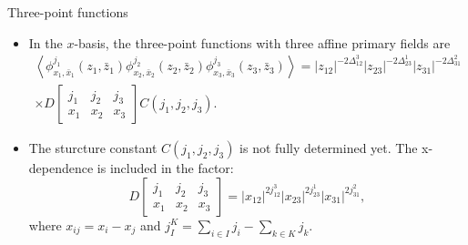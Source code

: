 \documentclass{beamer}
\newcommand{\vev}[1]{\left\langle #1 \right\rangle}
\begin{document}
\begin{frame}{Three-point functions}
  \begin{itemize}
    \item In the $x$-basis, the three-point functions with three affine primary fields are 
      {\tiny
        \begin{equation}
            \begin{aligned}
                    \vev{\phi^{j_{1}}_{x_{1},\bar{x}_{1}}(z_{1},\bar{z}_{1}) \phi^{j_{2}}_{x_{2},\bar{x}_{2}}(z_{2},\bar{z}_{2}) \phi^{j_{3}}_{x_{3},\bar{x}_{3}}(z_{3},\bar{z}_{3})} = 
                    |z_{12}|^{-2 \Delta_{12}^{3}} |z_{23}|^{-2 \Delta_{23}^{1}} |z_{31}|^{-2 \Delta_{31}^{2}} \\
                     \times D \left[\begin{array}{ccc}
            j_{1} & j_{2} & j_{3} \\
            x_{1} & x_{2} & x_{3}
            \end{array} \right] C(j_{1},j_{2},j_{3}).
            \end{aligned} \label{3pointfuncx}
        \end{equation}
      }
    \item The sturcture constant $C(j_{1},j_{2},j_{3})$ is not fully determined yet. The x-dependence is included in the factor:
        \begin{equation}
            D \left[\begin{array}{ccc}
            j_{1} & j_{2} & j_{3} \\
            x_{1} & x_{2} & x_{3}
            \end{array} \right] = |x_{12}|^{2 j_{12}^{3}} |x_{23}|^{2 j_{23}^{1}} |x_{31}|^{2 j_{31}^{2}},
        \end{equation}
        where $x_{ij} = x_{i}-x_{j}$ and $j_{I}^{K} = \sum_{i \in I} j_{i} - \sum_{k \in K} j_{k}$.
  \end{itemize}
\end{frame}
\end{document}

